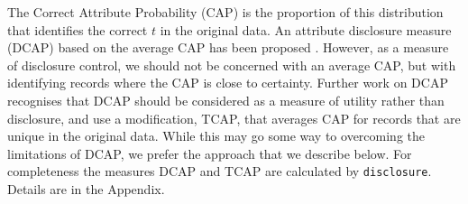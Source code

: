 \documentclass[12pt]{article}
\renewcommand{\baselinestretch}{1.5} %
\begin{document}
\renewcommand{\baselinestretch}{1.5}
The Correct Attribute Probability (CAP) is the proportion of this distribution that identifies the correct $t$ in the original data. An attribute disclosure measure (DCAP) based on the average CAP has been proposed \cite{elliot2014SYLLS, taubUNECE2017}. However, as a measure of disclosure control, we should not be concerned with an average CAP, but with identifying records where the CAP is close to certainty. Further work on DCAP \cite{taub_PSD2018, ChenUNECE2019,little2022} recognises that DCAP should be considered as a measure of utility rather than disclosure, and use a modification, TCAP, that averages CAP for records that are unique in the original data. 
While this may go some way to overcoming the limitations of DCAP, we prefer the approach that we describe below. For completeness the measures DCAP and TCAP are calculated by \texttt{disclosure}. Details are in the Appendix.
 
\end{document}
